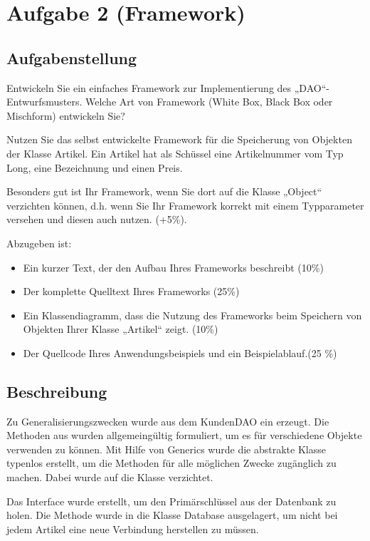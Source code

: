 \section{Aufgabe 2 (Framework)}
\subsection{Aufgabenstellung}
Entwickeln Sie ein einfaches Framework zur Implementierung des „DAO“-Entwurfsmusters.
Welche Art von Framework (White Box, Black Box oder Mischform) entwickeln Sie?

Nutzen Sie das selbst entwickelte Framework für die Speicherung von Objekten der Klasse
Artikel. Ein Artikel hat als Schüssel eine Artikelnummer vom Typ Long, eine Bezeichnung
und einen Preis.

Besonders gut ist Ihr Framework, wenn Sie dort auf die Klasse „Object“ verzichten können,
d.h. wenn Sie Ihr Framework korrekt mit einem Typparameter versehen und diesen auch
nutzen. (+5\%).

Abzugeben ist:
\begin{itemize}
  \item Ein kurzer Text, der den Aufbau Ihres Frameworks beschreibt (10\%)
  \item Der komplette Quelltext Ihres Frameworks (25\%)
  \item Ein Klassendiagramm, dass die Nutzung des Frameworks beim Speichern von
Objekten Ihrer Klasse „Artikel“ zeigt. (10\%)
  \item Der Quellcode Ihres Anwendungsbeispiels und ein Beispielablauf.(25 \%)
\end{itemize}

\subsection{Beschreibung}
Zu Generalisierungszwecken wurde aus dem KundenDAO ein 
erzeugt. Die Methoden aus  wurden allgemeingültig formuliert, um
es für verschiedene Objekte verwenden zu können. Mit Hilfe von Generics wurde
die abstrakte Klasse typenlos erstellt, um die Methoden für alle möglichen
Zwecke zugänglich zu machen. Dabei wurde auf die Klasse  verzichtet.

Das Interface  wurde erstellt, um den Primärschlüssel aus der
Datenbank zu holen. Die Methode  wurde in die Klasse Database
ausgelagert, um nicht bei jedem Artikel eine neue Verbindung herstellen zu müssen. 

